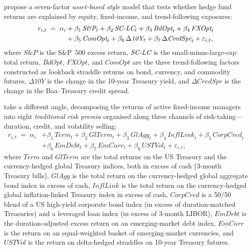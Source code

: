 \citet{fung2004hedge} propose a seven-factor \emph{asset-based
style} model that tests whether hedge fund returns are explained by
equity, fixed-income, and trend-following exposures:
\begin{equation}\label{eq:funghsieh}
\begin{split}
  r_{i,t} \;=\; \alpha_i
  &+ \beta_1\,\textit{S\&P}_t + \beta_2\,\textit{SC\text{-}LC}_t
   + \beta_3\,\textit{BdOpt}_t + \beta_4\,\textit{FXOpt}_t \\
  &+ \beta_5\,\textit{ComOpt}_t
   + \beta_6\,\Delta\textit{10Y}_t
   + \beta_7\,\Delta\textit{CredSpr}_t + \varepsilon_{i,t},
\end{split}
\end{equation}
where $\textit{S\&P}$ is the S\&P~500 excess return,
$\textit{SC\text{-}LC}$ is the small-minus-large-cap total return,
$\textit{BdOpt}$, $\textit{FXOpt}$, and $\textit{ComOpt}$ are the three
trend-following factors constructed as
lookback straddle returns on bond, currency, and commodity futures,
$\Delta\textit{10Y}$ is the change in the 10-year Treasury yield,
and $\Delta\textit{CredSpr}$ is the change in the Baa--Treasury
credit spread.

\citet{brooks2020active} take a different angle,
decomposing the returns of active fixed-income managers into eight
\emph{traditional risk premia} organised along three channels of
risk-taking---duration, credit, and volatility selling:
\begin{equation}\label{eq:brooks}
\begin{split}
  r_{i,t} \;=\; \alpha_i
  &+ \beta_1\,\textit{Term}_t + \beta_2\,\textit{GlTerm}_t
   + \beta_3\,\textit{GlAgg}_t + \beta_4\,\textit{InflLink}_t 
   + \beta_5\,\textit{CorpCred}_t \\
  &+ \beta_6\,\textit{EmDebt}_t + \beta_7\,\textit{EmCurr}_t 
  + \beta_8\,\textit{USTVol}_t + \varepsilon_{i,t},
\end{split}
\end{equation}
where $\textit{Term}$ and $\textit{GlTerm}$ are the total returns on
the US Treasury and the currency-hedged global Treasury indices, both
in excess of cash (3-month Treasury bills), $\textit{GlAgg}$ is the
total return on the currency-hedged global aggregate bond index in
excess of cash, $\textit{InflLink}$ is the total return on the
currency-hedged global inflation-linked Treasury index in excess of
cash, $\textit{CorpCred}$ is a 50/50
blend of a US high-yield corporate bond index (in excess of
duration-matched Treasuries) and a leveraged loan index (in
excess of 3-month LIBOR), $\textit{EmDebt}$ is the duration-adjusted
excess return on an emerging-market debt index,
$\textit{EmCurr}$ is the return on an equal-weighted basket of
emerging-market currencies, and $\textit{USTVol}$ is the return on
delta-hedged straddles on 10-year Treasury futures.

